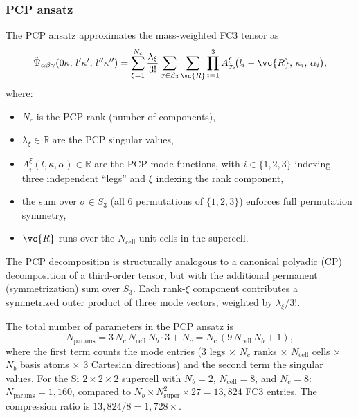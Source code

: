 \subsubsection{PCP ansatz}
\label{sssub:pcp_ansatz}

The PCP ansatz approximates the mass-weighted FC3 tensor as
\begin{equation}\label{eq:pcp_ansatz}
  \tilde{\Psi}_{\alpha\beta\gamma}
    (0\kappa,\, l'\kappa',\, l''\kappa'')
  = \sum_{\xi=1}^{N_c}
    \frac{\lambda_\xi}{3!}
    \sum_{\sigma\in S_3}
    \sum_{\vc{R}}
    \prod_{i=1}^{3}
    A_{\sigma_i}^{\xi}\!\bigl(l_i - \vc{R},\, \kappa_i,\, \alpha_i\bigr),
\end{equation}
where:
\begin{itemize}
  \item $N_c$ is the PCP rank (number of components),
  \item $\lambda_\xi \in \mathbb{R}$ are the PCP singular values,
  \item $A_i^{\xi}(l, \kappa, \alpha) \in \mathbb{R}$ are the PCP mode
        functions, with $i \in \{1,2,3\}$ indexing three independent
        ``legs'' and $\xi$ indexing the rank component,
  \item the sum over $\sigma \in S_3$ (all 6 permutations of
        $\{1,2,3\}$) enforces full permutation symmetry,
  \item $\vc{R}$ runs over the $N_\mathrm{cell}$ unit cells in the
        supercell.
\end{itemize}

The PCP decomposition is structurally analogous to a canonical
polyadic (CP) decomposition of a third-order tensor, but with the
additional permanent (symmetrization) sum over $S_3$.  Each rank-$\xi$
component contributes a symmetrized outer product of three mode
vectors, weighted by $\lambda_\xi / 3!$.

The total number of parameters in the PCP ansatz is
\begin{equation}
  N_\mathrm{params}
  = 3 \, N_c \, N_\mathrm{cell} \, N_b \cdot 3 + N_c
  = N_c \,(9\, N_\mathrm{cell}\, N_b + 1),
\end{equation}
where the first term counts the mode entries (3 legs $\times$ $N_c$
ranks $\times$ $N_\mathrm{cell}$ cells $\times$ $N_b$ basis atoms
$\times$ 3 Cartesian directions) and the second term the singular
values.  For the Si $2\times 2\times 2$ supercell with
$N_b = 2$, $N_\mathrm{cell} = 8$, and $N_c = 8$:
$N_\mathrm{params} = 1{,}160$, compared to
$N_b \times N_\mathrm{super}^2 \times 27 = 13{,}824$ FC3 entries.
The compression ratio is $13{,}824 / 8 = 1{,}728\times$.

